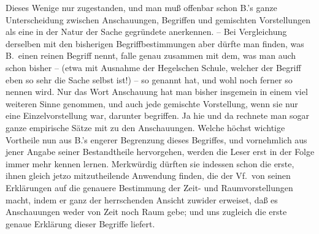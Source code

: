 Dieses Wenige nur zugestanden, und man muß offenbar schon B.'s ganze Unterscheidung zwischen Anschauungen, Begriffen und gemischten Vorstellungen als eine in der Natur der Sache gegründete anerkennen. -- Bei Vergleichung derselben mit den bisherigen Begriffbestimmungen aber dürfte man finden, was B.\ einen reinen Begriff nennt, falle genau zusammen mit dem, was man auch schon bisher -- (etwa mit Ausnahme der Hegelschen Schule, welcher der Begriff eben so sehr die Sache selbst ist!) -- so genannt hat, und wohl noch ferner so nennen wird. Nur das Wort Anschauung hat man bisher insgemein in einem viel weiteren Sinne genommen, und auch jede gemischte Vorstellung, wenn sie nur eine Einzelvorstellung war, darunter begriffen. Ja hie und da rechnete man sogar ganze empirische Sätze mit zu den Anschauungen. Welche höchst wichtige Vortheile nun aus B.'s engerer Begrenzung dieses Begriffes, und vornehmlich aus jener Angabe seiner Bestandtheile hervorgehen, werden die Leser erst in der Folge immer mehr kennen lernen. Merkwürdig dürften sie indessen schon die erste, ihnen gleich jetzo mitzutheilende Anwendung finden, die der Vf.\ von seinen Erklärungen auf die genauere Bestimmung der Zeit-  und Raumvorstellungen  macht, indem er ganz der herrschenden Ansicht zuwider erweiset, daß es Anschauungen weder von Zeit noch Raum gebe; und uns zugleich die erste genaue Erklärung dieser Begriffe liefert. \par
